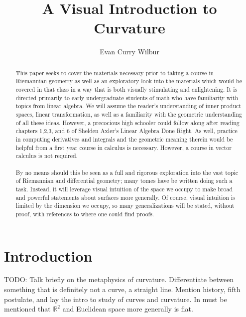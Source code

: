 \documentclass[]{article}
\title{A Visual Introduction to Curvature}
\author{Evan Curry Wilbur}
\newcommand\<{\ensuremath{\left\langle}}
\renewcommand\>{\ensuremath{\right\rangle}}
\newcommand{\RR}{\ensuremath{\mathbb{R}}}
\theoremstyle{definition}
\theoremstyle{definition}
\begin{document}
	\maketitle
	\begin{abstract}
		\indent
		This paper seeks to cover the materials necessary prior to taking a course in Riemannian geometry as well as an exploratory look into the materials which would be covered in that class in a way that is both visually stimulating and enlightening. It is directed primarily to early undergraduate students of math who have familiarity with topics from linear algebra. We will assume the reader's understanding of inner product spaces, linear transformation, as well as a familiarity with the geometric understanding of all these ideas. However, a precocious high schooler could follow along after reading chapters 1,2,3, and 6 of Shelden Axler's Linear Algebra Done Right. As well, practice in computing derivatives and integrals and the geometric meaning therein would be helpful from a first year course in calculus is necessary. However, a course in vector calculus is not required.
		\\
		\\
		\indent
		By no means should this be seen as a full and rigorous exploration into the vast topic of Riemannian and differential geometry; many tomes have be written doing such a task. Instead, it will leverage visual intuition of the space we occupy to make broad and powerful statements about surfaces more generally. Of course, visual intuition is limited by the dimension we occupy, so many generalizations will be stated, without proof, with references to where one could find proofs.
	\end{abstract}
	
	\section*{Introduction}
	TODO: Talk briefly on the metaphysics of curvature. Differentiate between something that is definitely not a curve, a straight line. Mention history, fifth postulate, and lay the intro to study of curves and curvature. In must be mentioned that $\RR^2$ and Euclidean space more generally is flat. 
	\newpage
	
\end{document}
